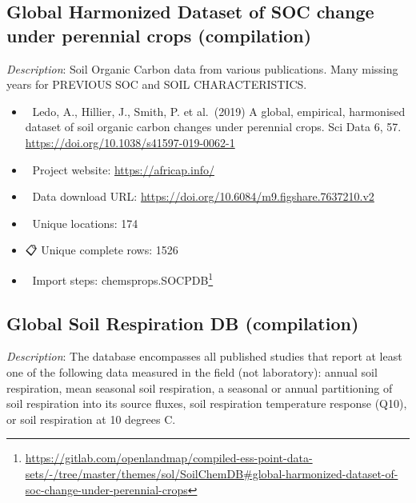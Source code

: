\documentclass[
  graybox,natbib,nospthms]{svmono}
\providecommand{\tightlist}{%
  \setlength{\itemsep}{0pt}\setlength{\parskip}{0pt}}
\providecommand{\tightlist}{\setlength{\itemsep}{0pt}\setlength{\parskip}{0pt}}
\renewcommand{\href}[2]{#2 (\url{#1})}
\renewcommand{\href}[2]{#2\footnote{\url{#1}}}
\begin{document}
\hypertarget{global-harmonized-dataset-of-soc-change-under-perennial-crops-compilation}{%
\subsection{Global Harmonized Dataset of SOC change under perennial crops (compilation)}\label{global-harmonized-dataset-of-soc-change-under-perennial-crops-compilation}}

\emph{Description}: Soil Organic Carbon data from various publications. Many missing
years for PREVIOUS SOC and SOIL CHARACTERISTICS.

\begin{itemize}
\tightlist
\item
  📕 Ledo, A., Hillier, J., Smith, P. et al.~(2019) A global, empirical, harmonised dataset of soil organic carbon changes under perennial crops. Sci Data 6, 57. \url{https://doi.org/10.1038/s41597-019-0062-1}\\
\item
  🔗 Project website: \url{https://africap.info/}\\
\item
  📂 Data download URL: \url{https://doi.org/10.6084/m9.figshare.7637210.v2}\\
\item
  📍 Unique locations: 174\\
\item
  📋 Unique complete rows: 1526\\
\item
  📝 Import steps: \href{https://gitlab.com/openlandmap/compiled-ess-point-data-sets/-/tree/master/themes/sol/SoilChemDB\#global-harmonized-dataset-of-soc-change-under-perennial-crops}{chemsprops.SOCPDB}
\end{itemize}

\hypertarget{global-soil-respiration-db-compilation}{%
\subsection{Global Soil Respiration DB (compilation)}\label{global-soil-respiration-db-compilation}}

\emph{Description}: The database encompasses all published studies that report at least one of the following data measured in the field (not laboratory): annual soil respiration, mean seasonal soil respiration, a seasonal or annual partitioning of soil respiration into its source fluxes, soil respiration temperature response (Q10), or soil respiration at 10 degrees C.
\end{document}
